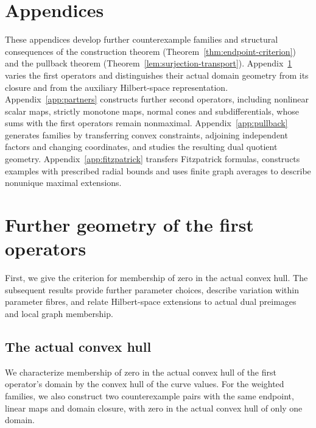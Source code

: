 \documentclass[11pt]{article}
\theoremstyle{definition}
\theoremstyle{remark}
\begin{document}
\section*{Appendices}
These appendices develop further counterexample families and structural consequences of the construction theorem (Theorem~\ref{thm:endpoint-criterion}) and the pullback theorem (Theorem~\ref{lem:surjection-transport}). Appendix~\ref{app:parameters} varies the first operators and distinguishes their actual domain geometry from its closure and from the auxiliary Hilbert-space representation. Appendix~\ref{app:partners} constructs further second operators, including nonlinear scalar maps, strictly monotone maps, normal cones and subdifferentials, whose sums with the first operators remain nonmaximal. Appendix~\ref{app:pullback} generates families by transferring convex constraints, adjoining independent factors and changing coordinates, and studies the resulting dual quotient geometry. Appendix~\ref{app:fitzpatrick} transfers Fitzpatrick formulas, constructs examples with prescribed radial bounds and uses finite graph averages to describe nonunique maximal extensions.

\section{Further geometry of the first operators}
\label{app:parameters}

First, we give the criterion for membership of zero in the actual convex hull. The subsequent results provide further parameter choices, describe variation within parameter fibres, and relate Hilbert-space extensions to actual dual preimages and local graph membership.

\subsection{The actual convex hull}
\label{subsec:appendix-convex-hull}

We characterize membership of zero in the actual convex hull of the first operator's domain by the convex hull of the curve values. For the weighted families, we also construct two counterexample pairs with the same endpoint, linear maps and domain closure, with zero in the actual convex hull of only one domain.
\end{document}
